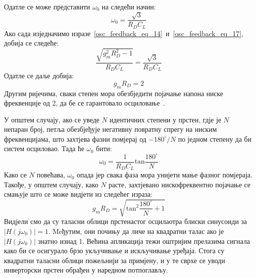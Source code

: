 \documentclass[master]{finthesis}
\begin{document}
Одатле се може представити $\omega_{0}$ на следећи начин:
\begin{equation}
	\label{osc_feedback_eq_17}
	\displaystyle
	\omega_{0} = \frac{\sqrt{3}}{R_{D}C_{L}}
\end{equation}
Ако сада изједначимо изразе~\ref{osc_feedback_eq_14}~и~\ref{osc_feedback_eq_17}, добија се следеће:
\begin{equation}
	\label{osc_feedback_eq_18}
	\displaystyle
	\frac{\sqrt{g_{m}^{2}R_{D}^{2}-1}}{R_{D}C_{L}} = \frac{\sqrt{3}}{R_{D}C_{L}}
\end{equation}
Одатле се даље добија:
\begin{equation}
	\label{osc_feedback_eq_19}
	\displaystyle
	g_{m}R_{D} = 2
\end{equation}
Другим ријечима, сваки степен мора обезбједити појачање напона ниске фреквенције од 2, да бе се гарантовало осциловање~\cite{Razavi:PLL_CMOS_2020}. \par
У општем случају, ако се уведе $N$ идентичних степени у прстен, гдје је $N$ непаран број, петља обезбјеђује негативну повратну спрегу на ниским фреквенцијама, што захтјева фазни помјерај од $-180^{\circ}/N$ по једном степену да би систем осциловао. Тада ће $\omega_{0}$ бити:
\begin{equation}
	\label{osc_feedback_eq_20}
	\displaystyle
	\omega_{0} = \frac{1}{R_{D}C_{L}}\text{tan}\frac{180^{\circ}}{N}
\end{equation}
Како се $N$ повећава, $\omega_{0}$ опада јер свака фаза мора унијети мање фазног помјераја. Такође, у општем случају, како $N$ расте, захтјевано нискофреквентно појачање се смањује што се може видјети из следећег израза:
\begin{equation}
	\label{osc_feedback_eq_21}
	\displaystyle
	g_{m}R_{D} = \sqrt{\text{tan}^{2}\frac{180^{\circ}}{N}+1}
\end{equation}
Видјели смо да су таласни облици прстенастог осцилаотра блиски синусоиди за $|H(j\omega_{0})|=1$. Meђутим, они почињу да личе на квадратни талас ако је $|H(j\omega_{0})|$ знатно изнад 1. Већина апликација тежи оштријим прелазима сигнала како би се осигурало брзо укључивање и искључивање уређаја. Стога су квадратни таласни облици пожељнији за примјену, и у те сврхе се уводи инверторски прстен обрађен у наредном потпоглављу.
\end{document}
